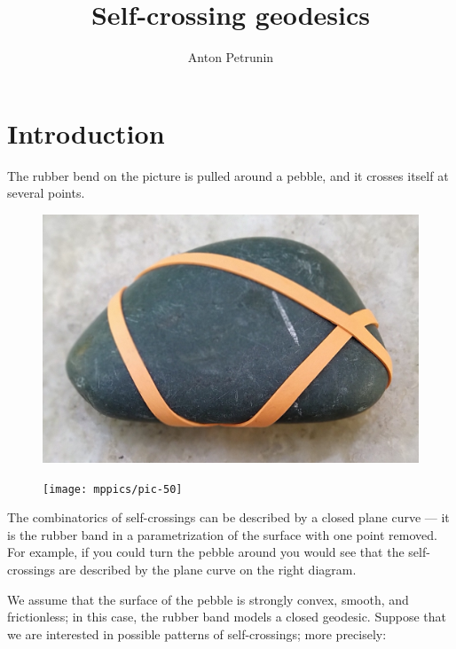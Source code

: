 \documentclass[oneside,a4paper]{amsart}
\begin{document}


\title{Self-crossing geodesics}
\author{Anton Petrunin}
\maketitle

\section{Introduction}


The rubber bend on the picture is pulled around a pebble,
and it crosses itself at several points.
\begin{figure}[!ht]
\hfill
\begin{minipage}{.56\textwidth}
\centering
\includegraphics[width=\textwidth]{pics/pebble.jpg}
\end{minipage}
\hfill
\begin{minipage}{.30\textwidth}
\centering
\texttt{[image: mppics/pic-50]}
\end{minipage}
\hfill
\end{figure}
The combinatorics of self-crossings can be described by a closed plane curve --- it is the rubber band in a parametrization of the surface with one point removed.
For example, if you could turn the pebble around you would see that the self-crossings are described by the plane curve on the right diagram.

We assume that the surface of the pebble is strongly convex, smooth, and frictionless;
in this case, the rubber band models a closed geodesic.
Suppose that we are interested in possible patterns of self-crossings; more precisely:
\end{document}
